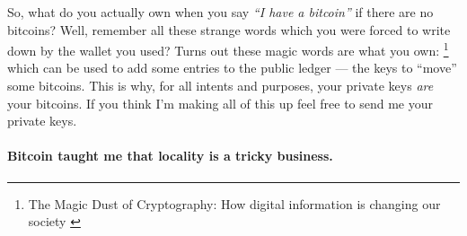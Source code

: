 So, what do you actually own when you say \textit{\enquote{I have a bitcoin}} if there
are no bitcoins? Well, remember all these strange words which you were forced to
write down by the wallet you used? Turns out these magic words are what you own:
\footnote{The Magic Dust of Cryptography: How digital information is changing
our society \cite{gigi:magic-spell}} which can be used to add some entries to the
public ledger --- the keys to ``move'' some bitcoins. This is why, for all
intents and purposes, your private keys \textit{are} your bitcoins. If you think
I'm making all of this up feel free to send me your private keys.

\paragraph{Bitcoin taught me that locality is a tricky business.}

%
%
%
%
%
%
%
